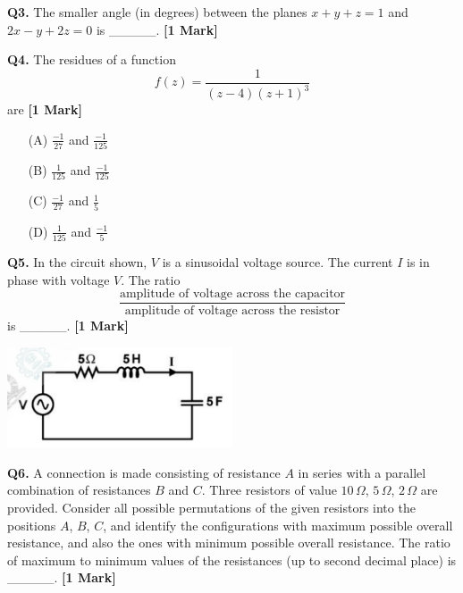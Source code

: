 \documentclass[11pt]{article}
\newcommand{\questiona}[2]{
    \noindent\textbf{Q#2.} #1 \hfill \textbf{[1 Mark]}
}
\begin{document}
\vspace{0.5cm}

\questiona{The smaller angle (in degrees) between the planes \( x + y + z = 1 \) and \( 2x - y + 2z = 0 \) is \_\_\_\_\_.}{3}

\vspace{0.5cm}

\questiona{The residues of a function  
\[ f(z) = \frac{1}{(z - 4)(z + 1)^3} \]  
are}{4}
\begin{enumerate}
    \item[(A)] \(\frac{-1}{27}\) and \(\frac{-1}{125}\)
    \item[(B)] \(\frac{1}{125}\) and \(\frac{-1}{125}\)
    \item[(C)] \(\frac{-1}{27}\) and \(\frac{1}{5}\)
    \item[(D)] \(\frac{1}{125}\) and \(\frac{-1}{5}\)
\end{enumerate}

\vspace{0.5cm}

\questiona{In the circuit shown, \(V\) is a sinusoidal voltage source. The current \(I\) is in phase with voltage \(V\). The ratio  
\[\frac{\text{amplitude of voltage across the capacitor}}{\text{amplitude of voltage across the resistor}}\]  
is \_\_\_\_\_.}{5}

\begin{center}
\includegraphics[width=0.5\textwidth]{figures/5.png}
\end{center}

\vspace{0.5cm}

\questiona{A connection is made consisting of resistance \(A\) in series with a parallel combination of resistances \(B\) and \(C\). Three resistors of value \(10\,\Omega\), \(5\,\Omega\), \(2\,\Omega\) are provided. Consider all possible permutations of the given resistors into the positions \(A\), \(B\), \(C\), and identify the configurations with maximum possible overall resistance, and also the ones with minimum possible overall resistance. The ratio of maximum to minimum values of the resistances (up to second decimal place) is \_\_\_\_\_.}{6}
\end{document}
